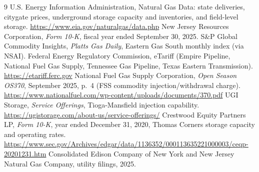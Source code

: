 \documentclass[11pt]{article}
\begin{document}
\begin{thebibliography}{9}
\footnotesize
\setlength{\itemsep}{0pt}
 U.S. Energy Information Administration, Natural Gas Data: state deliveries, citygate prices, underground storage capacity and inventories, and field-level storage. \url{https://www.eia.gov/naturalgas/data.php}
 New Jersey Resources Corporation, \emph{Form 10-K}, fiscal year ended September 30, 2025.
 S\&P Global Commodity Insights, \emph{Platts Gas Daily}, Eastern Gas South monthly index (via NSAI).
 Federal Energy Regulatory Commission, eTariff (Empire Pipeline, National Fuel Gas Supply, Tennessee Gas Pipeline, Texas Eastern Transmission). \url{https://etariff.ferc.gov}
 National Fuel Gas Supply Corporation, \emph{Open Season OS370}, September 2025, p.~4 (FSS commodity injection/withdrawal charge). \url{https://www.nationalfuel.com/wp-content/uploads/documents/370.pdf}
 UGI Storage, \emph{Service Offerings}, Tioga-Mansfield injection capability. \url{https://ugistorage.com/about-us/service-offerings/}
 Crestwood Equity Partners LP, \emph{Form 10-K}, year ended December 31, 2020, Thomas Corners storage capacity and operating rates. \url{https://www.sec.gov/Archives/edgar/data/1136352/000113635221000003/ceqp-20201231.htm}
 Consolidated Edison Company of New York and New Jersey Natural Gas Company, utility filings, 2025.
\end{thebibliography}
\end{document}
